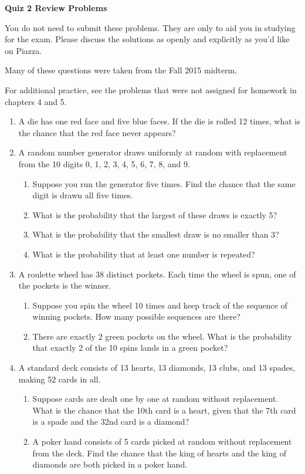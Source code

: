 \documentclass[11pt]{article}
\begin{document}
\centerline{\textbf{Quiz 2 Review Problems}}
You do not need to submit these problems. They are only to aid you in studying for the exam. Please discuss the solutions as openly and explicitly as you'd like on Piazza.

Many of these questions were taken from the Fall 2015 midterm.

For additional practice, see the problems that were not assigned for homework in chapters 4 and 5.

\begin{enumerate}
    \item A die has one red face and five blue faces. If the die is rolled 12 times, what is the chance that the red face never appears?

    \item A random number generator draws uniformly at random with replacement from the 10 digits 0, 1, 2, 3, 4, 5, 6, 7, 8, and 9. 
        \begin{enumerate}
            \item Suppose you run the generator five times. Find the chance that the same digit is drawn all five times.
            \item What is the probability that the largest of these draws is exactly 5?
            \item What is the probability that the smallest draw is no smaller than 3?
            \item What is the probability that at least one number is repeated?
        \end{enumerate}

    \item A roulette wheel has 38 distinct pockets. Each time the wheel is spun, one of the pockets is the winner. 
        \begin{enumerate}
            \item Suppose you spin the wheel 10 times and keep track of the sequence of winning pockets. How many possible sequences are there?
            \item There are exactly 2 green pockets on the wheel. What is the probability that exactly 2 of the 10 spins lands in a green pocket?
        \end{enumerate}

    \item A standard deck consists of 13 hearts, 13 diamonds, 13 clubs, and 13 spades, making 52 cards in all. 

        \begin{enumerate}
            \item Suppose cards are dealt one by one at random without replacement.
    What is the chance that the 10th card is a heart, given that the 7th card is a spade and the 32nd card is a diamond?
            \item A poker hand consists of 5 cards picked at random without replacement from the deck. 
    Find the chance that the king of hearts and the king
    of diamonds are both picked in a poker hand.
        \end{enumerate}


\end{enumerate}
\end{document}
